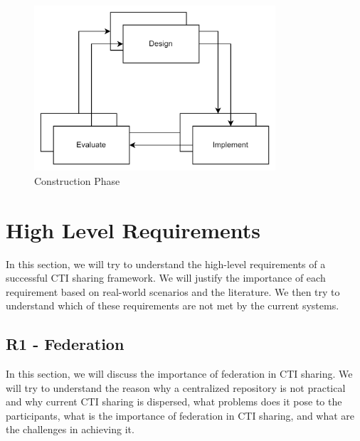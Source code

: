 \begin{figure}[ht]
    \centering
    \includegraphics[width=0.8\textwidth]{diagrams/conceptual/methodology-p2}
    \caption{Construction Phase}
    \label{fig:construction-phase}
\end{figure}

\section{High Level Requirements}
In this section, we will try to understand the high-level requirements of a successful CTI sharing framework. We will justify the importance of each requirement based on real-world scenarios and the literature. We then try to understand which of these requirements are not met by the current systems. 

\subsection{R1 - Federation}
In this section, we will discuss the importance of federation in CTI sharing. We will try to understand the reason why a centralized repository is not practical and why current CTI sharing is dispersed, what problems does it pose to the participants, what is the importance of federation in CTI sharing, and what are the challenges in achieving it.

